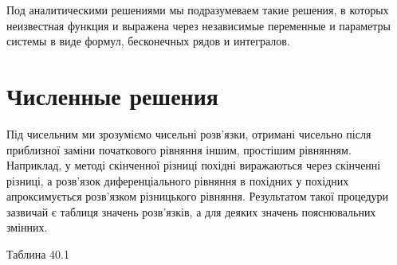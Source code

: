 \documentclass[
  ukrainian,
]{article}
\begin{document}
Под аналитическими решениями мы подразумеваем такие решения, в которых
неизвестная функция и выражена через независимые переменные и параметры
системы в виде формул, бесконечных рядов и интегралов.

\section{Численные
решения}\label{ux447ux438ux441ux43bux435ux43dux43dux44bux435-ux440ux435ux448ux435ux43dux438ux44f}

Під чисельним ми зрозуміємо чисельні розв'язки, отримані чисельно після
приблизної заміни початкового рівняння іншим, простішим рівнянням.
Наприклад, у методі скінченної різниці похідні виражаються через
скінченні різниці, а розв'язок диференціального рівняння в похідних у
похідних апроксимується розв'язком різницького рівняння. Результатом
такої процедури зазвичай є таблиця значень розв'язків, а для деяких
значень пояснювальних змінних.

Таблина 40.1
\end{document}
